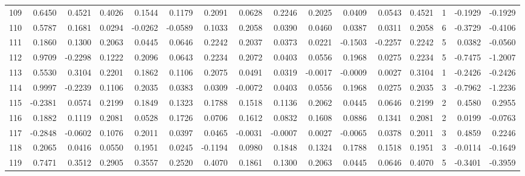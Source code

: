 \begin{tabular}{lrrrrrrrrrrrrrrr}
109 &      0.6450 &  0.4521 &  0.4026 &  0.1544 &  0.1179 &  0.2091 &  0.0628 &  0.2246 &  0.2025 &  0.0409 &   0.0543 &     0.4521 &      1 &                   -0.1929 &                    -0.1929 \\
110 &      0.5787 &  0.1681 &  0.0294 & -0.0262 & -0.0589 &  0.1033 &  0.2058 &  0.0390 &  0.0460 &  0.0387 &   0.0311 &     0.2058 &      6 &                   -0.3729 &                    -0.4106 \\
111 &      0.1860 &  0.1300 &  0.2063 &  0.0445 &  0.0646 &  0.2242 &  0.2037 &  0.0373 &  0.0221 & -0.1503 &  -0.2257 &     0.2242 &      5 &                    0.0382 &                    -0.0560 \\
112 &      0.9709 & -0.2298 &  0.1222 &  0.2096 &  0.0643 &  0.2234 &  0.2072 &  0.0403 &  0.0556 &  0.1968 &   0.0275 &     0.2234 &      5 &                   -0.7475 &                    -1.2007 \\
113 &      0.5530 &  0.3104 &  0.2201 &  0.1862 &  0.1106 &  0.2075 &  0.0491 &  0.0319 & -0.0017 & -0.0009 &   0.0027 &     0.3104 &      1 &                   -0.2426 &                    -0.2426 \\
114 &      0.9997 & -0.2239 &  0.1106 &  0.2035 &  0.0383 &  0.0309 & -0.0072 &  0.0403 &  0.0556 &  0.1968 &   0.0275 &     0.2035 &      3 &                   -0.7962 &                    -1.2236 \\
115 &     -0.2381 &  0.0574 &  0.2199 &  0.1849 &  0.1323 &  0.1788 &  0.1518 &  0.1136 &  0.2062 &  0.0445 &   0.0646 &     0.2199 &      2 &                    0.4580 &                     0.2955 \\
116 &      0.1882 &  0.1119 &  0.2081 &  0.0528 &  0.1726 &  0.0706 &  0.1612 &  0.0832 &  0.1608 &  0.0886 &   0.1341 &     0.2081 &      2 &                    0.0199 &                    -0.0763 \\
117 &     -0.2848 & -0.0602 &  0.1076 &  0.2011 &  0.0397 &  0.0465 & -0.0031 & -0.0007 &  0.0027 & -0.0065 &   0.0378 &     0.2011 &      3 &                    0.4859 &                     0.2246 \\
118 &      0.2065 &  0.0416 &  0.0550 &  0.1951 &  0.0245 & -0.1194 &  0.0980 &  0.1848 &  0.1324 &  0.1788 &   0.1518 &     0.1951 &      3 &                   -0.0114 &                    -0.1649 \\
119 &      0.7471 &  0.3512 &  0.2905 &  0.3557 &  0.2520 &  0.4070 &  0.1861 &  0.1300 &  0.2063 &  0.0445 &   0.0646 &     0.4070 &      5 &                   -0.3401 &                    -0.3959 \\

\end{tabular}
